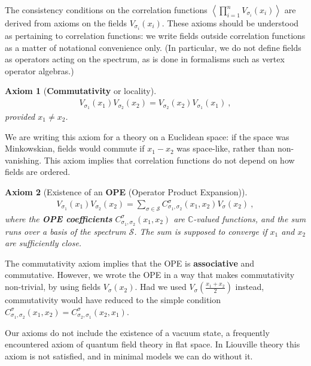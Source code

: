 \documentclass[12pt, a4paper, notitlepage, twoside]{report}
\numberwithin{equation}{section}
\theoremstyle{break}
\newtheorem{hyp}{Axiom}[chapter]
\begin{document}
The consistency conditions on the correlation functions $\left\langle\prod_{i=1}^n V_{\sigma_i}(x_i)\right\rangle$ are derived from axioms on the fields $V_{\sigma_i}(x_i)$. These axioms should be understood as pertaining to correlation functions: we write fields outside correlation functions as a matter of notational convenience only. (In particular, we do not define fields as operators acting on the spectrum, as is done in formalisms such as vertex operator algebras.) 

\begin{hyp}[\textbf{Commutativity} or locality]
\label{ax:col}
\begin{align}
 \boxed{V_{\sigma_1}(x_1)V_{\sigma_2}(x_2) = V_{\sigma_2}(x_2) V_{\sigma_1}(x_1)}\ ,
\label{comm}
\end{align}
provided $x_1\neq x_2$. 
\end{hyp}
\noindent
We are writing this axiom for a theory on a Euclidean space: if the space was Minkowskian, fields would commute if $x_1-x_2$ was space-like, rather than non-vanishing. 
This axiom implies that correlation functions do not depend on how fields are ordered.

\begin{hyp}[Existence of an \textbf{\boldmath OPE} (Operator Product Expansion)]
 \label{ax:ope}
 \begin{align}
 \boxed{V_{\sigma_1}(x_1)V_{\sigma_2}(x_2) = \sum_{\sigma\in \mathcal{S}} C_{\sigma_1,\sigma_2}^{\sigma}(x_1,x_2) V_{\sigma}(x_2)}\ ,
\label{ope}
\end{align}
where the \textbf{\boldmath OPE coefficients} $C_{\sigma_1,\sigma_2}^{\sigma}(x_1,x_2)$ are $\mathbb{C}$-valued functions, and the sum runs over a basis of the spectrum $\mathcal{S}$. 
The sum is supposed to converge if $x_1$ and $x_2$ are sufficiently close. 
\end{hyp} 
\noindent
The commutativity axiom implies that the OPE is \textbf{associative} and commutative. However, we wrote the OPE in a way that makes commutativity non-trivial, by using fields $V_\sigma(x_2)$. Had we used $V_\sigma(\frac{x_1+x_2}{2})$ instead, commutativity would have reduced to the simple condition $C_{\sigma_1,\sigma_2}^{\sigma}(x_1,x_2) = C_{\sigma_2,\sigma_1}^{\sigma}(x_2,x_1)$.

Our axioms do not include the existence of a vacuum state, a frequently encountered axiom of quantum field theory in flat space.
In Liouville theory this axiom is not satisfied, and in minimal models we can do without it. 
\end{document}

